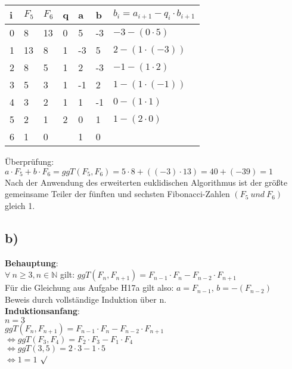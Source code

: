 \documentclass[11pt,a4paper]{article}
\begin{document}
\begin{center}
	\begin{tabular}{ | l | l | l | l | l | l | l|}
		\hline
		i&$F_5$&$F_6$&q&a&b&$b_i=a_{i+1}-q_i \cdot b_{i+1} $ \\ \hline	\hline	
		0&8&13&0&5&-3&$-3-(0 \cdot 5 )$ \\ \hline
		1&13&8&1&-3&5&$2-(1 \cdot (-3) )$ \\ \hline
		2&8&5&1&2&-3&$-1-(1 \cdot 2)$\\ \hline
		3&5&3&1&-1&2&$1-(1 \cdot (-1))$ \\ \hline
		4&3&2&1&1&-1&$0-(1 \cdot 1)$ \\ \hline
		5&2&1&2&0&1&$1-(2\cdot 0)$ \\ \hline
		6&1&0&&1&0&\\ \hline
	\end{tabular}
\end{center}

Überprüfung:\\
$a\cdot F_5 +b \cdot F_6 = ggT(F_5,F_6) = 5 \cdot 8 + ((-3)\cdot 13) = 40+(-39)=1$\\
Nach der Anwendung des erweiterten euklidischen Algorithmus ist der größte gemeinsame Teiler der fünften und sechsten Fibonacci-Zahlen $(F_5~und~F_6)$ gleich 1.\\

\newpage
\subsection*{b)}
\textbf{Behauptung}: \\
$\forall~n \geq 3, n \in \mathbb{N}$ gilt: 
$ggT(F_n, F_{n+1}) = F_{n-1} \cdot F_n - F_{n-2} \cdot F_{n+1}$\\
Für die Gleichung aus Aufgabe H17a gilt also: $a = F_{n-1}$, $b = -(F_{n-2})$ \\

Beweis durch vollständige Induktion über n.\\

\textbf{Induktionsanfang}:\\
$n=3$ \\
$ggT(F_n, F_{n+1}) = F_{n-1} \cdot F_n - F_{n-2} \cdot F_{n+1}$ \\
$\Leftrightarrow ggT(F_3, F_{4}) = F_{2} \cdot F_3 - F_{1} \cdot F_{4}$ \\
$\Leftrightarrow ggT(3, 5) = 2 \cdot 3 - 1 \cdot 5$ \\
$\Leftrightarrow 1 = 1$   $\surd$  \\
\end{document}
